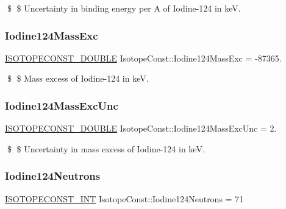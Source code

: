 \$ \$ Uncertainty in binding energy per A of Iodine-\/124 in keV. \mbox{\label{group___isotope_const-_iodine-_i124_ga9f1d25ed87a09a9fb2151deab9ec67d7}} 
\subsubsection{\texorpdfstring{Iodine124\+Mass\+Exc}{Iodine124MassExc}}
{\footnotesize\ttfamily \mbox{\hyperlink{group___isotope_const-_macros_ga8f45a7272ce02c0b4c65c44636ed719a}{I\+S\+O\+T\+O\+P\+E\+C\+O\+N\+S\+T\+\_\+\+D\+O\+U\+B\+LE}} Isotope\+Const\+::\+Iodine124\+Mass\+Exc = -\/87365.}

\$ \$ Mass excess of Iodine-\/124 in keV. \mbox{\label{group___isotope_const-_iodine-_i124_ga965126266ba7cb42d7b9b8b67f1216b1}} 
\subsubsection{\texorpdfstring{Iodine124\+Mass\+Exc\+Unc}{Iodine124MassExcUnc}}
{\footnotesize\ttfamily \mbox{\hyperlink{group___isotope_const-_macros_ga8f45a7272ce02c0b4c65c44636ed719a}{I\+S\+O\+T\+O\+P\+E\+C\+O\+N\+S\+T\+\_\+\+D\+O\+U\+B\+LE}} Isotope\+Const\+::\+Iodine124\+Mass\+Exc\+Unc = 2.}

\$ \$ Uncertainty in mass excess of Iodine-\/124 in keV. \mbox{\label{group___isotope_const-_iodine-_i124_ga1264e979e5da40d5673129c81ef5069a}} 
\subsubsection{\texorpdfstring{Iodine124\+Neutrons}{Iodine124Neutrons}}
{\footnotesize\ttfamily \mbox{\hyperlink{group___isotope_const-_macros_ga5f18360b3e99483a35c32d789e62621c}{I\+S\+O\+T\+O\+P\+E\+C\+O\+N\+S\+T\+\_\+\+I\+NT}} Isotope\+Const\+::\+Iodine124\+Neutrons = 71}

